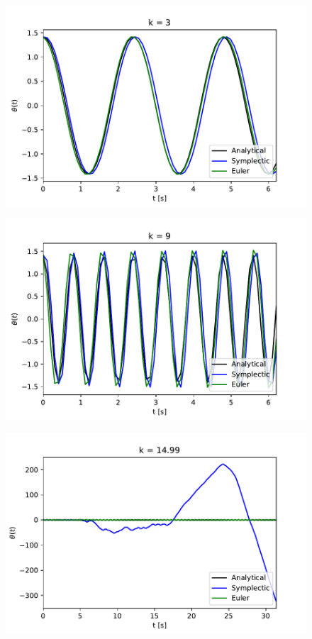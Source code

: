 \noindent
\begin{figure}[ht!]
	\centering
	\begin{minipage}[b]{0.4\textwidth}
	  \includegraphics[scale=0.6]{../figures/k3_nonlin.pdf}
		\label{phaseDot}
	\end{minipage}
	\hfill
	\begin{minipage}[b]{0.4\textwidth}
	  \includegraphics[scale=0.6]{../figures/k9_nonlin.pdf}
		\label{phaseDot2}
	\end{minipage}
	\begin{minipage}[b]{0.4\textwidth}
	  \includegraphics[scale=0.6]{../figures/k15_nonlin.pdf}

\end{minipage}
\end{figure}
